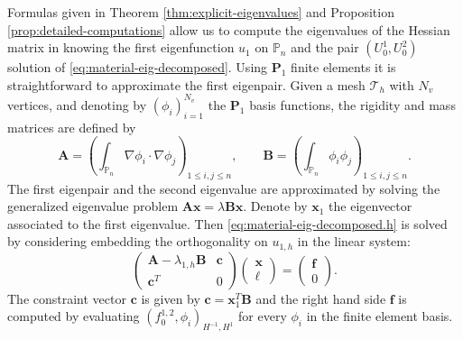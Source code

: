 \documentclass[11pt]{article}
\numberwithin{equation}{section}\newtheorem*{jepEnonce}{\jepEnonceTitle}\newenvironment{enonce*}[1]{\def\jepEnonceTitle{#1}\jepEnonce}{\endjepEnonce}\newtheorem*{conj*}{Conjecture}
\theoremstyle{plain}
\theoremstyle{definition}
\newcommand{\bo}[1]{{\boldsymbol#1}}
\let\Bbb\mathbb
\begin{document}
Formulas given in Theorem \ref{thm:explicit-eigenvalues} and Proposition \ref{prop:detailed-computations} allow us to compute the eigenvalues of the Hessian matrix in knowing the first eigenfunction $u_1$ on $\Bbb{P}_n$ and the pair $(U_0^1,U_0^2)$ solution of \eqref{eq:material-eig-decomposed}. Using ${\bo P_1}$ finite elements it is straightforward to approximate the first eigenpair. Given a mesh $\mathcal T_h$ with $N_v$ vertices, and denoting by $(\phi_i)_{i=1}^{N_v}$ the ${\bo P_1}$ basis functions, the rigidity and mass matrices are defined by
\[
\bo A = \left(\int_{\Bbb P_n} \nabla \phi_i \cdot \nabla \phi_j\right)_{1\leq i,j\leq n},\qquad \bo B = \left(\int_{\Bbb P_n} \phi_i \phi_j\right)_{1\leq i,j\leq n}.
\]
The first eigenpair and the second eigenvalue are approximated by solving the generalized eigenvalue problem $\bo A \bo x = \lambda \bo B \bo x$. Denote by $\bo x_1$ the eigenvector associated to the first eigenvalue. Then \eqref{eq:material-eig-decomposed.h} is solved by considering embedding the orthogonality on $u_{1,h}$ in the linear system:
\[
\begin{pmatrix}
\bo A - \lambda_{1,h} \bo B & \bo c \\
\bo c^T & 0
\end{pmatrix}
\begin{pmatrix}
\bo x \\ \ell
\end{pmatrix}
= \begin{pmatrix}
\bo f \\
0
\end{pmatrix}.
\]
The constraint vector $\bo c$ is given by $\bo c = \bo x_1^T \bo B$ and the right hand side $\bo f$ is computed by evaluating $(f_0^{1,2},\phi_i)_{H^{-1},H^1}$ for every $\phi_i$ in the finite element basis.
\end{document}
